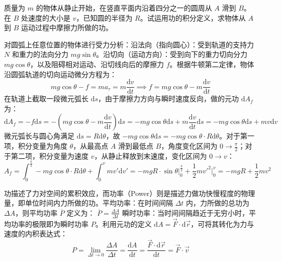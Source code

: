 \documentclass[lang=cn,11pt]{elegantbook}
\begin{document}
\begin{exercise}
质量为 $m$ 的物体从静止开始，在竖直平面内沿着四分之一的圆周从 $A$ 滑到 $B$。在 $B$ 处速度的大小是 $v$，已知圆的半径为 $R$。试运用功的积分定义，求物体从 $A$ 到 $B$ 运动过程中摩擦力所做的功。
\end{exercise}
\begin{solution}
对圆弧上任意位置的物体进行受力分析：沿法向（指向圆心）：受到轨道的支持力 $N$ 和重力的法向分力 $mg\sin\theta$。沿切向（运动方向）：受到向下的重力切向分力 $mg\cos\theta$，以及阻碍相对运动、沿切线向后的摩擦力 $f$。根据牛顿第二定律，物体沿圆弧轨道的切向运动微分方程为：$$mg\cos\theta - f = ma_\tau = m\frac{\mathrm{d}v}{\mathrm{d}t}\implies f = mg\cos\theta - m\frac{\mathrm{d}v}{\mathrm{d}t}$$
在轨道上截取一段微元弧长 $\mathrm{d}s$，由于摩擦力方向与瞬时速度反向，做的元功 $\mathrm{d}A_f$ 为：
$$\mathrm{d}A_f = -f\mathrm{d}s = -\left(mg\cos\theta - m\frac{\mathrm{d}v}{\mathrm{d}t}\right)\mathrm{d}s= -mg\cos\theta\mathrm{d}s + m\frac{\mathrm{d}v}{\mathrm{d}t}\mathrm{d}s= -mg\cos\theta\mathrm{d}s + mv\mathrm{d}v$$
微元弧长与圆心角满足 $\mathrm{d}s = R\mathrm{d}\theta$，故 $-mg\cos\theta\mathrm{d}s = -mg\cos\theta \cdot R\mathrm{d}\theta$。对于第一项，积分变量为角度 $\theta$，从最高点 $A$ 滑到最低点 $B$，角度变化区间为 $0 \to \frac{\pi}{2}$；对于第二项，积分变量为速度 $v$，从静止释放到末速度，变化区间为 $0 \to v$：
$$A_f = \int_{0}^{\frac{\pi}{2}} -mg\cos\theta \cdot R\mathrm{d}\theta + \int_{0}^{v} mv'\mathrm{d}v'= -mgR \cdot \sin\theta \Big|_0^{\frac{\pi}{2}} + \frac{1}{2}mv'^2 \Big|_0^v= -mgR + \frac{1}{2}mv^2$$
\end{solution}

\begin{definition}[功率]
功描述了力对空间的累积效应，而功率（Power）则是描述力做功快慢程度的物理量，即单位时间内力所做的功。平均功率：在时间间隔 $\Delta t$ 内，力所做的总功为 $\Delta A$，则平均功率 $\overline{P}$ 定义为： \(\overline{P} = \frac{\Delta A}{\Delta t}\) 瞬时功率：当时间间隔趋近于无穷小时，平均功率的极限即为瞬时功率 $P$。利用元功的定义 $\mathrm{d}A = \vec{F} \cdot \mathrm{d}\vec{r}$，可将其转化为力与速度的内积表达式：$$P = \lim_{\Delta t \to 0} \frac{\Delta A}{\Delta t} = \frac{\mathrm{d}A}{\mathrm{d}t} = \frac{\vec{F} \cdot \mathrm{d}\vec{r}}{\mathrm{d}t} = \vec{F} \cdot \vec{v}$$
\end{definition}
\end{document}

